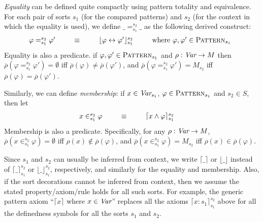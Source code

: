 \documentclass[UTF8,11pt]{article}
\theoremstyle{plain}
\theoremstyle{definition}
\theoremstyle{remark}
\newcommand{\Pattern}{\textsc{Pattern}\xspace}
\newcommand{\ra}{\rightarrow}
\newcommand{\lra}{\leftrightarrow}
\begin{document}
\emph{Equality} can be defined quite compactly using pattern totality and
equivalence.
For each pair of sorts $s_1$ (for the compared patterns) and
$s_2$ (for the context in which the equality is used), we define
$\_=_{s_1}^{s_2}\_$ as the following derived construct:
$$
\begin{array}{@{}rcll}
\varphi =_{s_1}^{s_2} \varphi' & \ \ \ \ \ \equiv \ \ \ \ \ &
\lfloor\varphi \lra \varphi'\rfloor_{s_1}^{s_2}
& \ \ \ \ \ \mbox{where } \varphi,\varphi' \in \Pattern_{s_1}
\end{array}
$$
Equality is also a predicate.
if $\varphi,\varphi' \in \Pattern_{s_1}$ and $\rho : \Var \ra M$ then
$\overline{\rho}(\varphi =_{s_1}^{s_2} \varphi') = \emptyset$
iff $\overline{\rho}(\varphi) \neq \overline{\rho}(\varphi')$, and
$\overline{\rho}(\varphi =_{s_1}^{s_2} \varphi') = M_{s_2}$
iff $\overline{\rho}(\varphi) = \overline{\rho}(\varphi')$.

Similarly, we can define \emph{membership}:
if $x\in\textit{Var}_{s_1}$, $\varphi\in\Pattern_{s_1}$ and $s_2\in S$, then
let
$$
\begin{array}{@{}rcll}
x \in_{s_1}^{s_2} \varphi & \ \ \ \ \ \equiv \ \ \ \ \ &
\lceil x \wedge \varphi\rceil_{s_1}^{s_2}
& %
\end{array}
$$
Membership is also a predicate.
Specifically, for any $\rho:\Var\ra M$,
$\overline{\rho}(x \in_{s_1}^{s_2} \varphi) = \emptyset$
iff $\rho(x) \not\in \overline{\rho}(\varphi)$, and
$\overline{\rho}(x \in_{s_1}^{s_2} \varphi) = M_{s_2}$
iff $\rho(x) \in \overline{\rho}(\varphi)$.

Since $s_1$ and $s_2$ can usually be inferred from context,
we write $\lceil\_\rceil$ or $\lfloor\_\rfloor$ instead of
$\lceil\_\rceil_{s_1}^{s_2}$ or $\lfloor\_\rfloor_{s_1}^{s_2}$, respectively,
and similarly for the equality and membership.
Also, if the sort decorations cannot be inferred from context, then we assume
the stated property/axiom/rule holds for all such sorts.
%
For example, the generic pattern axiom ``$\lceil x \rceil$ where $x\in\textit{Var}$''
replaces all the axioms $\lceil x\!:\!s_1 \rceil_{s_1}^{s_2}$ above for all
the definedness symbols for all the sorts $s_1$ and $s_2$.
\end{document}
